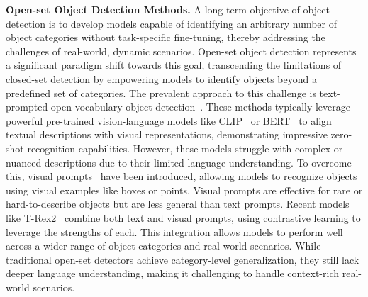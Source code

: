\textbf{Open-set Object Detection Methods.}
A long-term objective of object detection is to develop models capable of identifying an arbitrary number of object categories without task-specific fine-tuning, thereby addressing the challenges of real-world, dynamic scenarios. Open-set object detection represents a significant paradigm shift towards this goal, transcending the limitations of closed-set detection by empowering models to identify objects beyond a predefined set of categories. The prevalent approach to this challenge is text-prompted open-vocabulary object detection~\cite{li2022grounded, liu2023grounding, VLP:MDETR, yao2022detclip, zhong2022regionclip, ren2024dino, ghiasi2022scaling, cheng2024yolo, ma2023codet}. These methods typically leverage powerful pre-trained vision-language models like CLIP~\cite{VLP:CLIP} or BERT~\cite{devlin2018bert} to align textual descriptions with visual representations, demonstrating impressive zero-shot recognition capabilities. However, these models struggle with complex or nuanced descriptions due to their limited language understanding.
To overcome this, visual prompts~\cite{jiang2025t, jiang2023t, ren2024dino, wang2025yoloe, ravi2024sam, TransF:SAM, zou2023segment, li2024segment} have been introduced, allowing models to recognize objects using visual examples like boxes or points. Visual prompts are effective for rare or hard-to-describe objects but are less general than text prompts. Recent models like T-Rex2~\cite{jiang2025t} combine both text and visual prompts, using contrastive learning to leverage the strengths of each. This integration allows models to perform well across a wider range of object categories and real-world scenarios. While traditional open-set detectors achieve category-level generalization, they still lack deeper language understanding, making it challenging to handle context-rich real-world scenarios.

